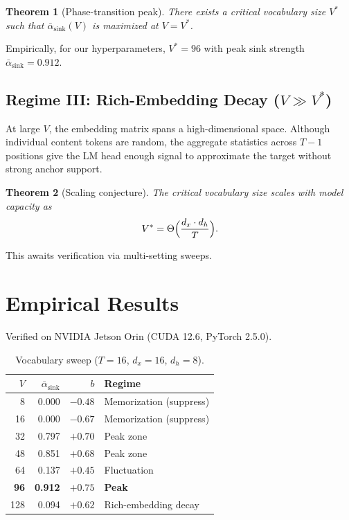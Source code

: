\documentclass[11pt,a4paper]{amsart}
\theoremstyle{plain}
\newtheorem{theorem}{Theorem}[section]
\theoremstyle{definition}
\begin{document}
\begin{theorem}[Phase-transition peak]
There exists a critical vocabulary size $V^*$ such that
$\bar\alpha_{\mathrm{sink}}(V)$ is maximized at $V=V^*$.
\end{theorem}

Empirically, for our hyperparameters, $V^*=96$ with peak sink strength
$\bar\alpha_{\mathrm{sink}}=0.912$.

\subsection{Regime III: Rich-Embedding Decay ($V \gg V^*$)}

At large $V$, the embedding matrix spans a high-dimensional space.
Although individual content tokens are random, the aggregate statistics
across $T-1$ positions give the LM head enough signal to approximate
the target without strong anchor support.

\begin{theorem}[Scaling conjecture]
The critical vocabulary size scales with model capacity as
\[
V^* = \Theta\Bigl(\frac{d_x\cdot d_h}{T}\Bigr).
\]
\end{theorem}

This awaits verification via multi-setting sweeps.

\section{Empirical Results}

Verified on NVIDIA Jetson Orin (CUDA 12.6, PyTorch 2.5.0).

\begin{table}[h]
\centering
\begin{tabular}{@{}rrrl@{}}
\toprule
$V$ & $\bar\alpha_{\mathrm{sink}}$ & $b$ & Regime \\
\midrule
8   & 0.000 & $-0.48$ & Memorization (suppress) \\
16  & 0.000 & $-0.67$ & Memorization (suppress) \\
32  & 0.797 & $+0.70$ & Peak zone \\
48  & 0.851 & $+0.68$ & Peak zone \\
64  & 0.137 & $+0.45$ & Fluctuation \\
\textbf{96} & \textbf{0.912} & \textbf{$+0.75$} & \textbf{Peak} \\
128 & 0.094 & $+0.62$ & Rich-embedding decay \\
\bottomrule
\end{tabular}
\caption{Vocabulary sweep ($T=16$, $d_x=16$, $d_h=8$).}
\end{table}
\end{document}
